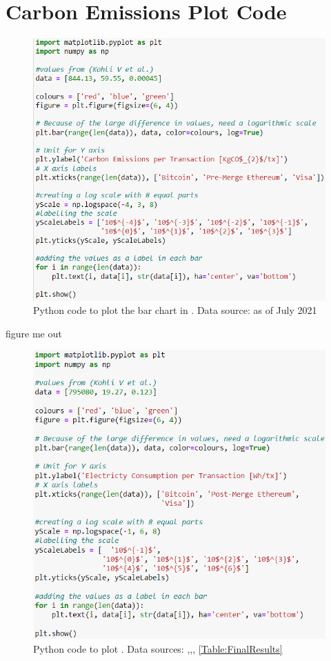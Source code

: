 \chapter{Carbon Emissions Plot Code}

\begin{figure}[h]
    \centering
    \includegraphics[width=13cm,center]{Figures/CarbonEmissionsPlotCode.png}
    \caption{Python code to plot the bar chart in . Data source: \cite{Kohli2023AnSolutions} as of July 2021}
    \label{Figure:CarbonEmissionsPlotCode}
\end{figure}

figure me out
\begin{figure}[h]
    \centering
    \includegraphics[width=13cm,center]{Figures/ElectrictyConsumptionPlotCode.png}
    \caption{Python code to plot . Data sources: \cite{VisaHome},\cite{2022VisaReport},\cite{BitcoinDigiconomist}, \ref{Table:FinalResults} }
    \label{Figure:ElectrictyConsumptionPlotCode}
\end{figure}